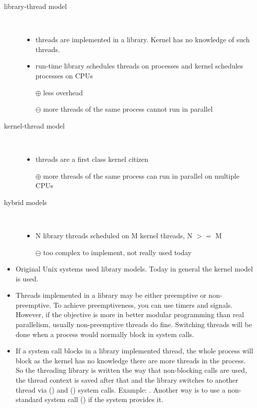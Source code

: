 \begin{slide}
\setlength{\baselineskip}{0.8\baselineskip}
\begin{description}
\item[library-thread model]~\\\vspace{-2.5ex}
    \begin{itemize}
    \item threads are implemented in a library.  Kernel has no knowledge of
    such threads.
    \item run-time library schedules threads on processes and kernel schedules
    processes on CPUs
    \item[$\oplus$] less overhead
    \item[$\ominus$] more threads of the same process cannot run in parallel
    \end{itemize}
\item [kernel-thread model]~\\\vspace{-2.5ex}
    \begin{itemize}
    \item threads are a first class kernel citizen
    \item[$\oplus$] more threads of the same process can run in parallel on
    multiple CPUs
    \end{itemize}
\item[hybrid models]~\\\vspace{-2.5ex}
    \begin{itemize}
    \item N library threads scheduled on M kernel threads, N $>=$ M
    \item[$\ominus$] too complex to implement, not really used today
    \end{itemize}
\end{description}
\end{slide}

\begin{itemize}
\item Original Unix systems used library models.  Today in general the kernel
model is used.
\item Threads implemented in a library may be either preemptive or
non-pre\-emp\-tive.  To achieve preemptiveness, you can use timers and signals.
However, if the objective is more in better modular programming than real
parallelism, usually non-preemptive threads do fine.  Switching threads will be
done when a process would normally block in system calls.
\item \label{SETJMP} If a system call blocks in a library implemented thread,
the whole process will block as the kernel has no knowledge there are more
threads in the process.  So the threading library is written the way that
non-blocking calls are used, the thread context is saved after that and the
library switches to another thread via () and ()
system calls.  Example: .  Another way is to use a
non-standard system call () if the system provides it.
\end{itemize}

